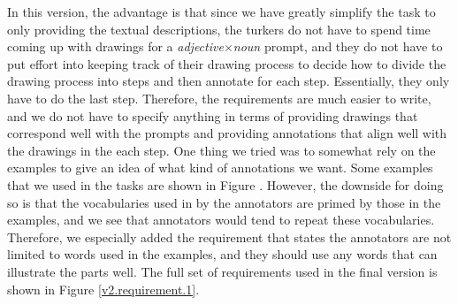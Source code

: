 In this version, the advantage is that since we have greatly simplify the task to only providing the textual descriptions, the turkers do not have to spend time coming up with drawings for a \textit{adjective}$\times$\textit{noun} prompt, and they do not have to put effort into keeping track of their drawing process to decide how to divide the drawing process into steps and then annotate for each step. Essentially, they only have to do the last step. Therefore, the requirements are much easier to write, and we do not have to specify anything in terms of providing drawings that correspond well with the prompts and providing annotations that align well with the drawings in the each step. 
One thing we tried was to somewhat rely on the examples to give an idea of what kind of annotations we want. Some examples that we used in the tasks are shown in Figure .
However, the downside for doing so is that the vocabularies used in by the annotators are primed by those in the examples, and we see that annotators would tend to repeat these vocabularies. Therefore, we especially added the requirement that states the annotators are not limited to words used in the examples, and they should use any words that can illustrate the parts well. The full set of requirements used in the final version is shown in Figure \ref{v2.requirement.1}.

